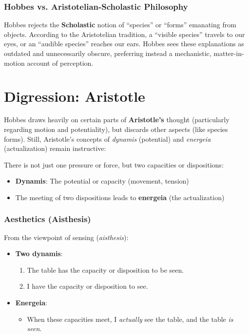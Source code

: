 \subsubsection*{Hobbes vs. Aristotelian-Scholastic Philosophy}
Hobbes rejects the \textbf{Scholastic} notion of “species” or “forms” emanating from objects. According to the Aristotelian tradition, a “visible species” travels to our eyes, or an “audible species” reaches our ears. Hobbes sees these explanations as outdated and unnecessarily obscure, preferring instead a mechanistic, matter-in-motion account of perception.

\section*{Digression: Aristotle}

Hobbes draws heavily on certain parts of \textbf{Aristotle’s} thought (particularly regarding motion and potentiality), but discards other aspects (like species forms). Still, Aristotle’s concepts of \textit{dynamis} (potential) and \textit{energeia} (actualization) remain instructive:

\begin{remark}
There is not just one pressure or force, but two capacities or dispositions:
\begin{itemize}
  \item \textbf{Dynamis}: The potential or capacity (movement, tension)
  \item The meeting of two dispositions leads to \textbf{energeia} (the actualization)
\end{itemize}
\end{remark}

\subsubsection*{Aesthetics (Aisthesis)}
From the viewpoint of sensing (\textit{aisthesis}):
\begin{itemize}
  \item \textbf{Two dynamis}:
  \begin{enumerate}
    \item The table has the capacity or disposition to be seen.
    \item I have the capacity or disposition to see.
  \end{enumerate}
  \item \textbf{Energeia}:
    \begin{itemize}
      \item When these capacities meet, I \textit{actually} see the table, and the table \textit{is seen}.
    \end{itemize}
\end{itemize}


